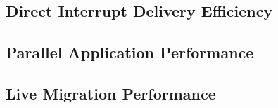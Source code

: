 \vspace{-0.1in}
\subsection{Direct Interrupt Delivery Efficiency}
\vspace{-0.05in}


\vspace{-0.1in}
\subsection{Parallel Application Performance}
\vspace{-0.05in}


\vspace{-0.1in}
\subsection{Live Migration Performance}
\vspace{-0.05in}

